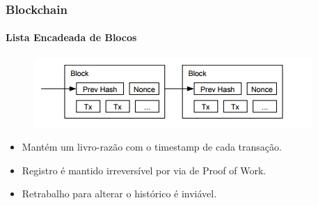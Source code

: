 \documentclass[11pt, red]{beamer}
\begin{document}
\begin{frame}
    \frametitle{Blockchain}
    \framesubtitle{Lista Encadeada de Blocos}
    \begin{figure}[htb]\label{ex1}
        \begin{center}
            \includegraphics[width=0.6\linewidth]{fig/btc2.png}
        \end{center}
    \end{figure}
    \begin{beamerboxesrounded}[lower=fundocinza,shadow=true]{}
        \begin{itemize}
        	\item Mant\'em um livro-raz\~ao com o timestamp de cada transa\c{c}\~ao.
            \item Registro \'e mantido irrevers\'ivel por via de Proof of Work.
            \item Retrabalho para alterar o hist\'orico \'e invi\'avel.
        \end{itemize}
    \end{beamerboxesrounded}
\end{frame}
    
\end{document}
